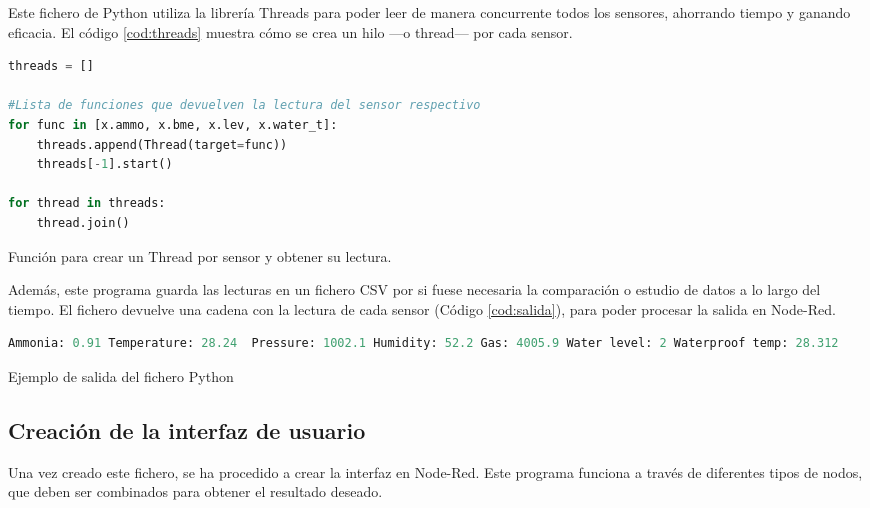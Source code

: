 Este fichero de Python utiliza la librería Threads para poder leer de manera concurrente todos los sensores, ahorrando tiempo y ganando eficacia. El código \ref{cod:threads} muestra cómo se crea un hilo ---o thread--- por cada sensor.\\
\begin{code}[h]
\begin{lstlisting}[language=Python]
threads = []

#Lista de funciones que devuelven la lectura del sensor respectivo
for func in [x.ammo, x.bme, x.lev, x.water_t]: 
	threads.append(Thread(target=func))
	threads[-1].start()
	
for thread in threads:
	thread.join()
\end{lstlisting}
\caption[Función para crear un Thread por sensor y obtener su lectura.]{Función para crear un Thread por sensor y obtener su lectura.}
\label{cod:threads}
\end{code}

Además, este programa guarda las lecturas en un fichero CSV por si fuese necesaria la comparación o estudio de datos a lo largo del tiempo. El fichero devuelve una cadena con la lectura de cada sensor (Código \ref{cod:salida}), para poder procesar la salida en Node-Red.\\
\begin{code}[h]
\begin{lstlisting}[language=Python]
Ammonia: 0.91 Temperature: 28.24  Pressure: 1002.1 Humidity: 52.2 Gas: 4005.9 Water level: 2 Waterproof temp: 28.312
\end{lstlisting}
\caption[Ejemplo de salida del fichero Python]{Ejemplo de salida del fichero Python}
\label{cod:salida}
\end{code}

\subsection{Creación de la interfaz de usuario}
Una vez creado este fichero, se ha procedido a crear la interfaz en Node-Red. Este programa funciona a través de diferentes tipos de nodos, que deben ser combinados para obtener el resultado deseado.\\

